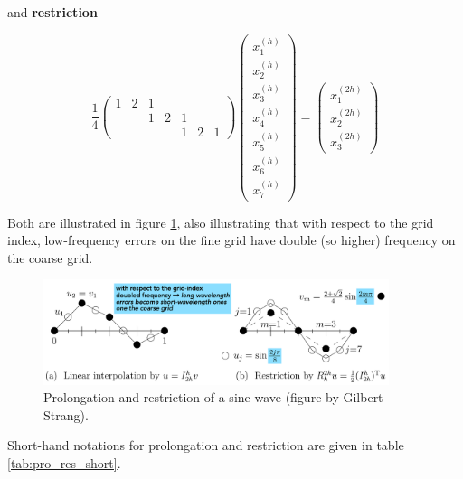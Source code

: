 and \textbf{restriction}

\begin{equation}
    \frac{1}{4}\left(\begin{array}{lllllll}
    1 & 2 & 1 & & & & \\
    & & 1 & 2 & 1 & & \\
    & & & & 1 & 2 & 1
    \end{array}\right)\left(\begin{array}{l}
    x^{(h)}_1 \\
    x^{(h)}_2 \\
    x^{(h)}_3 \\
    x^{(h)}_4 \\
    x^{(h)}_5 \\
    x^{(h)}_6 \\
    x^{(h)}_7
    \end{array}\right)=\left(\begin{array}{l}
    x^{(2h)}_1 \\
    x^{(2h)}_2 \\
    x^{(2h)}_3
    \end{array}\right)
\end{equation}

Both are illustrated in figure \ref{fig:sinprores}, also illustrating that with respect to 
the grid index, low-frequency errors on the fine grid have double (so higher) frequency on the coarse grid.

\begin{figure}[H]
    \centering
    \includegraphics[width=0.9\textwidth]{figures/sinprores.pdf}
    \caption{Prolongation and restriction of a sine wave (figure by Gilbert Strang).}
    \label{fig:sinprores}
\end{figure}



Short-hand notations for prolongation and restriction are
given in table \ref{tab:pro_res_short}.

